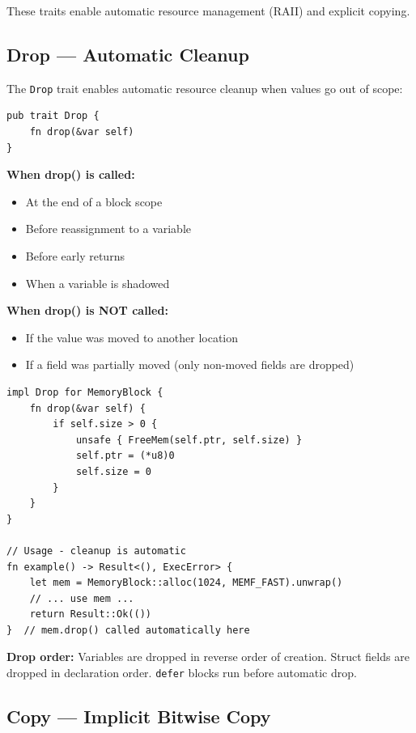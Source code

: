 These traits enable automatic resource management (RAII) and explicit copying.

\subsection{Drop --- Automatic Cleanup}

The \texttt{Drop} trait enables automatic resource cleanup when values go out of scope:

\begin{lstlisting}
pub trait Drop {
    fn drop(&var self)
}
\end{lstlisting}

\textbf{When drop() is called:}
\begin{itemize}
    \item At the end of a block scope
    \item Before reassignment to a variable
    \item Before early returns
    \item When a variable is shadowed
\end{itemize}

\textbf{When drop() is NOT called:}
\begin{itemize}
    \item If the value was moved to another location
    \item If a field was partially moved (only non-moved fields are dropped)
\end{itemize}

\begin{lstlisting}
impl Drop for MemoryBlock {
    fn drop(&var self) {
        if self.size > 0 {
            unsafe { FreeMem(self.ptr, self.size) }
            self.ptr = (*u8)0
            self.size = 0
        }
    }
}

// Usage - cleanup is automatic
fn example() -> Result<(), ExecError> {
    let mem = MemoryBlock::alloc(1024, MEMF_FAST).unwrap()
    // ... use mem ...
    return Result::Ok(())
}  // mem.drop() called automatically here
\end{lstlisting}

\begin{notebox}
\textbf{Drop order:} Variables are dropped in reverse order of creation. Struct fields are dropped in declaration order. \texttt{defer} blocks run before automatic drop.
\end{notebox}

\subsection{Copy --- Implicit Bitwise Copy}

